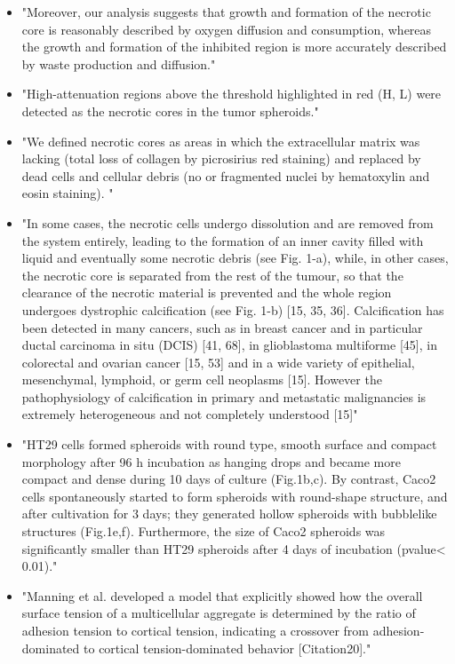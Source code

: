 \documentclass[11pt,a4paper]{article}
\begin{document}
\begin{itemize}
\item "Moreover, our analysis suggests that growth and formation of the necrotic core is reasonably described by oxygen diffusion and consumption, whereas the growth and formation of the inhibited region is more accurately described by waste production and diffusion."\cite{Murphy2023}

\item "High-attenuation regions above the threshold highlighted in red (H, L) were detected as the necrotic cores in the tumor spheroids."\cite{Huang2017}
\item "We defined necrotic cores as areas in which the extracellular matrix was lacking (total loss of collagen by picrosirius red staining) and replaced by dead cells and cellular debris (no or fragmented nuclei by hematoxylin and
eosin staining). "\cite{Thim2010}

\item "In some cases, the necrotic cells undergo dissolution
and are removed from the system entirely, leading to the formation of an inner cavity filled with liquid and eventually some necrotic debris (see Fig. 1-a), while, in other cases, the necrotic core is separated from the
rest of the tumour, so that the clearance of the necrotic material is prevented and the whole region undergoes dystrophic calcification (see Fig. 1-b) [15, 35, 36]. Calcification has been detected in many cancers, such as
in breast cancer and in particular ductal carcinoma in situ (DCIS) [41, 68], in glioblastoma multiforme [45], in colorectal and ovarian cancer [15, 53] and in a wide variety of epithelial, mesenchymal, lymphoid, or germ
cell neoplasms [15]. However the pathophysiology of calcification in primary and metastatic malignancies is extremely heterogeneous and not completely understood [15]"\cite{Giverso2018}

\item "HT29 cells formed spheroids with round type, smooth surface and compact morphology after 96 h incubation as hanging drops and became more compact and dense during 10 days of culture (Fig.1b,c). By contrast, Caco2 cells spontaneously started to form spheroids with round-shape structure, and after cultivation for 3 days; they generated hollow spheroids with bubblelike structures (Fig.1e,f). Furthermore, the size of Caco2 spheroids was significantly smaller than HT29 spheroids after 4 days of incubation (pvalue< 0.01)."\cite{Gheytanchi2021}

\item "Manning et al. developed a model that explicitly showed how the overall surface tension of a multicellular aggregate is determined by the ratio of adhesion tension to cortical tension, indicating a crossover from adhesion-dominated to cortical tension-dominated behavior [Citation20]."\cite{Boot2021}


\end{itemize}
\end{document}
